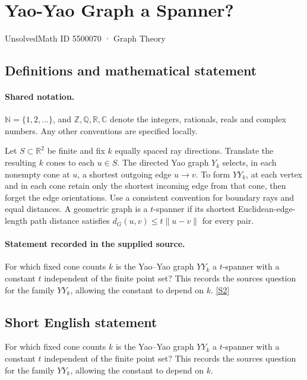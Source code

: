 \documentclass[11pt]{article}
\newcommand{\sref}[2]{\hyperlink{source:#1:#2}{[S#2]}}
\begin{document}
\setcounter{section}{5500069}
\section{Yao-Yao Graph a Spanner?}\label{5500070}
{\small\sffamily UnsolvedMath ID 5500070 · Graph Theory}
\subsection{Definitions and mathematical statement}

\paragraph{Shared notation.}$\mathbb N=\{1,2,\ldots\}$, and $\mathbb Z,\mathbb Q,\mathbb R,\mathbb C$ denote the integers, rationals, reals and complex numbers. Any other conventions are specified locally.


Let $S\subset\mathbb R^2$ be finite and fix $k$ equally spaced ray directions. Translate the resulting $k$ cones to each $u\in S$. The directed Yao graph $Y_k$ selects, in each nonempty cone at $u$, a shortest outgoing edge $u\to v$. To form $YY_k$, at each vertex and in each cone retain only the shortest incoming edge from that cone, then forget the edge orientations. Use a consistent convention for boundary rays and equal distances. A geometric graph is a $t$-spanner if its shortest Euclidean-edge-length path distance satisfies $d_G(u,v)\le t\lVert u-v\rVert$ for every pair.
\paragraph{Statement recorded in the supplied source.}
For which fixed cone counts $k$ is the Yao--Yao graph $YY_k$ a $t$-spanner with a constant $t$ independent of the finite point set? This records the source\textquotesingle s question for the family $YY_k$, allowing the constant to depend on $k$. \sref{5500070}{2}
\subsection{Short English statement}
For which fixed cone counts $k$ is the Yao--Yao graph $YY_k$ a $t$-spanner with a constant $t$ independent of the finite point set? This records the source\textquotesingle s question for the family $YY_k$, allowing the constant to depend on $k$.
\end{document}
